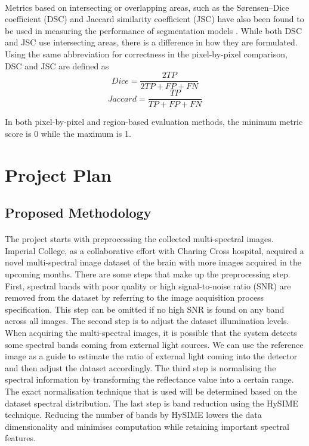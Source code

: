 \documentclass[12pt]{article}
\begin{document}
    \paragraph{}
    Metrics based on intersecting or overlapping areas, such as the Sørensen–Dice coefficient (DSC) \cite{dice_measures_1945} and Jaccard similarity coefficient (JSC) \cite{murphy_finley_1996} have also been found to be used in measuring the performance of segmentation models \cite{seidlitz_robust_2022, yun_spectr_2021, haj-hassan_classifications_2017}. While both DSC and JSC use intersecting areas, there is a difference in how they are formulated. Using the same abbreviation for correctness in the pixel-by-pixel comparison, DSC and JSC are defined as
    \[Dice = \frac{2TP}{2TP + FP + FN}\]
    \[Jaccard = \frac{TP}{TP + FP + FN}\]

    In both pixel-by-pixel and region-based evaluation methods, the minimum metric score is 0 while the maximum is 1.


\section{Project Plan}

    \subsection*{Proposed Methodology}
    \paragraph{}
    The project starts with preprocessing the collected multi-spectral images. Imperial College, as a collaborative effort with Charing Cross hospital, acquired a novel multi-spectral image dataset of the brain with more images acquired in the upcoming months. There are some steps that make up the preprocessing step. First, spectral bands with poor quality or high signal-to-noise ratio (SNR) are removed from the dataset by referring to the image acquisition process specification. This step can be omitted if no high SNR is found on any band across all images. The second step is to adjust the dataset illumination levels. When acquiring the multi-spectral images, it is possible that the system detects some spectral bands coming from external light sources. We can use the reference image as a guide to estimate the ratio of external light coming into the detector and then adjust the dataset accordingly. The third step is normalising the spectral information by transforming the reflectance value into a certain range. The exact normalisation technique that is used will be determined based on the dataset spectral distribution. The last step is band reduction using the HySIME technique. Reducing the number of bands by HySIME lowers the data dimensionality and minimises computation while retaining important spectral features.
\end{document}
